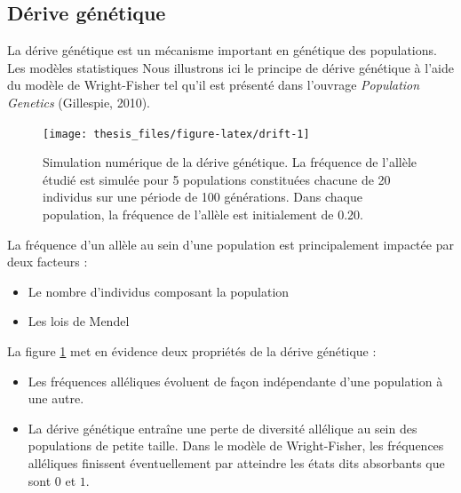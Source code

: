 \documentclass[12pt,twoside]{ugathesis}
\begin{document}
  \subsection{Dérive génétique}\label{derive-genetique}
  
  La dérive génétique est un mécanisme important en génétique des
  populations. Les modèles statistiques Nous illustrons ici le principe de
  dérive génétique à l'aide du modèle de Wright-Fisher tel qu'il est
  présenté dans l'ouvrage \textit{Population Genetics} (Gillespie, 2010).
  \begin{figure}
  
  {\centering \texttt{[image: thesis\_files/figure-latex/drift-1]} 
  
  }
  
  \caption{Simulation numérique de la dérive génétique. La fréquence de l'allèle étudié est simulée pour 5 populations constituées chacune de 20 individus sur une période de 100 générations. Dans chaque population, la fréquence de l'allèle est initialement de 0.20.}\label{fig:drift}
  \end{figure}
  La fréquence d'un allèle au sein d'une population est principalement
  impactée par deux facteurs :
  \begin{itemize}
  \item
    Le nombre d'individus composant la population
  \item
    Les lois de Mendel
  \end{itemize}
  La figure \ref{fig:drift} met en évidence deux propriétés de la dérive
  génétique :
  \begin{itemize}
  \item
    Les fréquences alléliques évoluent de façon indépendante d'une
    population à une autre.
  \item
    La dérive génétique entraîne une perte de diversité allélique au sein
    des populations de petite taille. Dans le modèle de Wright-Fisher, les
    fréquences alléliques finissent éventuellement par atteindre les états
    dits absorbants que sont \(0\) et \(1\).
  \end{itemize}
\end{document}
